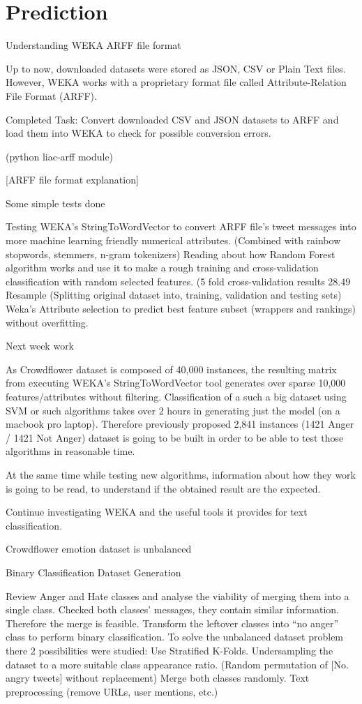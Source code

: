 \section{Prediction}

Understanding WEKA ARFF file format

Up to now, downloaded datasets were stored as JSON, CSV or Plain Text files. However, WEKA works with a proprietary format file called Attribute-Relation File Format (ARFF).

Completed Task:
Convert downloaded CSV and JSON datasets to ARFF and load them into WEKA to check for possible conversion errors.

(python liac-arff module)

[ARFF file format explanation]

Some simple tests done

Testing WEKA's StringToWordVector to convert ARFF file's tweet messages into more machine learning friendly numerical attributes. (Combined with rainbow stopwords, stemmers, n-gram tokenizers)
Reading about how Random Forest algorithm works and use it to make a rough training and cross-validation classification with random selected features. (5 fold cross-validation results 28.49%
Resample (Splitting original dataset into, training, validation and testing sets)
Weka's Attribute selection to predict best feature subset (wrappers and rankings) without overfitting.

Next week work

As Crowdflower dataset is composed of 40,000 instances, the resulting matrix from executing WEKA's StringToWordVector tool generates over sparse 10,000 features/attributes without filtering.
Classification of a such a big dataset using SVM or such algorithms takes over 2 hours in generating just the model (on a macbook pro laptop).
Therefore previously proposed 2,841 instances (1421 Anger / 1421 Not Anger) dataset is going to be built in order to be able to test those algorithms in reasonable time.

At the same time while testing new algorithms, information about how they work is going to be read, to understand if the obtained result are the expected.

Continue investigating WEKA and the useful tools it provides for text classification.

Crowdflower emotion dataset is unbalanced

Binary Classification Dataset Generation

Review  Anger and Hate classes and analyse the viability of merging them into a single class.
Checked both classes’ messages, they contain similar information. Therefore the merge is feasible.
Transform the leftover classes into “no anger” class to perform binary classification.
To solve the unbalanced dataset problem there 2 possibilities were studied: 
Use Stratified K-Folds. 
Undersampling the dataset to a more suitable class appearance ratio. (Random permutation of [No. angry tweets] without replacement)
Merge both classes randomly.
Text preprocessing (remove URLs, user mentions, etc.)

